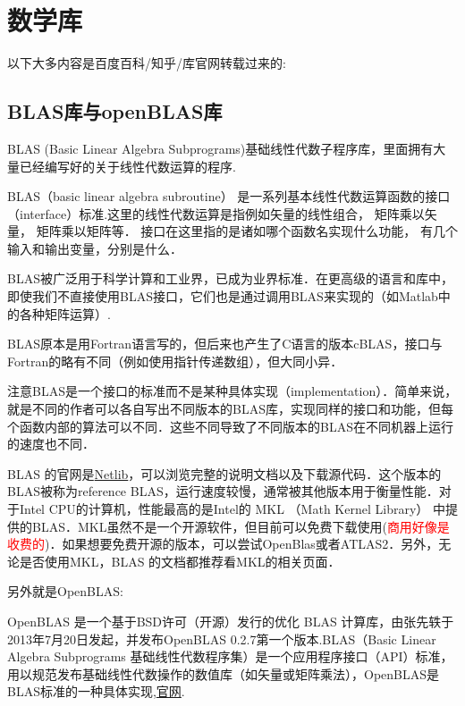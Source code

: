 \section{数学库}
以下大多内容是百度百科/知乎/库官网转载过来的:
\subsection{BLAS库与openBLAS库}
BLAS (Basic Linear Algebra Subprograms)基础线性代数子程序库，里面拥有大量已经编写好的关于线性代数运算的程序.\par
BLAS（basic linear algebra subroutine） 是一系列基本线性代数运算函数的接口（interface）标准.这里的线性代数运算是指例如矢量的线性组合， 矩阵乘以矢量， 矩阵乘以矩阵等． 接口在这里指的是诸如哪个函数名实现什么功能， 有几个输入和输出变量，分别是什么．\par

BLAS被广泛用于科学计算和工业界，已成为业界标准．在更高级的语言和库中，即使我们不直接使用BLAS接口，它们也是通过调用BLAS来实现的（如Matlab中的各种矩阵运算）.\par

BLAS原本是用Fortran语言写的，但后来也产生了C语言的版本cBLAS，接口与Fortran的略有不同（例如使用指针传递数组），但大同小异．\par

注意BLAS是一个接口的标准而不是某种具体实现（implementation）．简单来说，就是不同的作者可以各自写出不同版本的BLAS库，实现同样的接口和功能，但每个函数内部的算法可以不同．这些不同导致了不同版本的BLAS在不同机器上运行的速度也不同．\par

BLAS 的官网是\href{https://netlib.org/blas/}{Netlib}，可以浏览完整的说明文档以及下载源代码．这个版本的BLAS被称为reference BLAS，运行速度较慢，通常被其他版本用于衡量性能．对于Intel CPU的计算机，性能最高的是Intel的 MKL （Math Kernel Library） 中提供的BLAS．MKL虽然不是一个开源软件，但目前可以免费下载使用(\textcolor{red}{商用好像是收费的})．如果想要免费开源的版本，可以尝试OpenBlas或者ATLAS2．另外，无论是否使用MKL，BLAS 的文档都推荐看MKL的相关页面．\par

另外就是OpenBLAS:\par
OpenBLAS 是一个基于BSD许可（开源）发行的优化 BLAS 计算库，由张先轶于2013年7月20日发起，并发布OpenBLAS 0.2.7第一个版本.BLAS（Basic Linear Algebra Subprograms 基础线性代数程序集）是一个应用程序接口（API）标准，用以规范发布基础线性代数操作的数值库（如矢量或矩阵乘法），OpenBLAS是BLAS标准的一种具体实现,\href{https://www.openblas.net/}{官网}.\par

